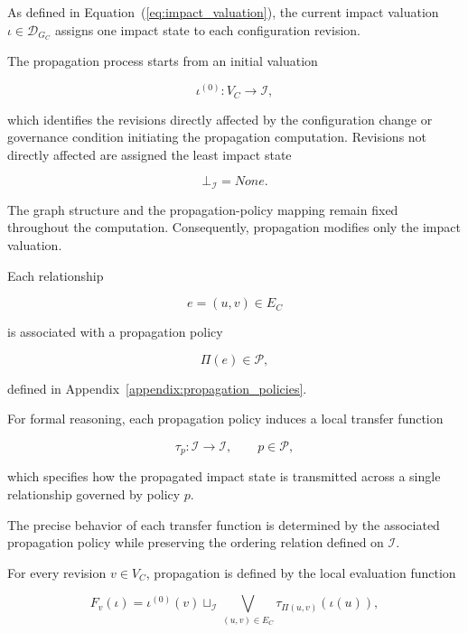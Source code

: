 \documentclass[10pt]{article}
\begin{document}
As defined in Equation~(\ref{eq:impact_valuation}), the current impact valuation $\iota\in\mathcal D_{G_C}$ assigns one impact state to each configuration revision.

The propagation process starts from an initial valuation

\begin{equation}
	\iota^{(0)} : V_C \rightarrow \mathcal{I},
	\label{eq:initial_impact_valuation}
\end{equation}

which identifies the revisions directly affected by the configuration change or
governance condition initiating the propagation computation. Revisions not
directly affected are assigned the least impact state

\[
\bot_{\mathcal I}=None.
\]

The graph structure and the propagation-policy mapping remain fixed throughout the computation. Consequently, propagation modifies only the impact valuation.


Each relationship

\[
e=(u,v)\in E_C
\]

is associated with a propagation policy

\[
\Pi(e)\in\mathcal P,
\]

defined in Appendix~\ref{appendix:propagation_policies}.

For formal reasoning, each propagation policy induces a local transfer function

\begin{equation}
	\tau_p :
	\mathcal I
	\rightarrow
	\mathcal I,
	\qquad
	p\in\mathcal P,
	\label{eq:transfer_function}
\end{equation}

which specifies how the propagated impact state is transmitted across a single relationship governed by policy $p$.

The precise behavior of each transfer function is determined by the associated propagation policy while preserving the ordering relation defined on
$\mathcal I$.


For every revision $v\in V_C$, propagation is defined by the local evaluation function

\begin{equation}
	\label{eq:local_transfer}
	F_v(\iota)
	=
	\iota^{(0)}(v)
	\sqcup_{\mathcal I}
	\bigvee_{(u,v)\in E_C}
	\tau_{\Pi(u,v)}
	\!\left(
	\iota(u)
	\right),
\end{equation}
\end{document}
